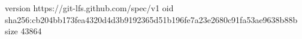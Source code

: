 version https://git-lfs.github.com/spec/v1
oid sha256:cb204bb173fea4320d4d3b9192365d51b196fe7a23e2680c91fa53ae9638b88b
size 43864
